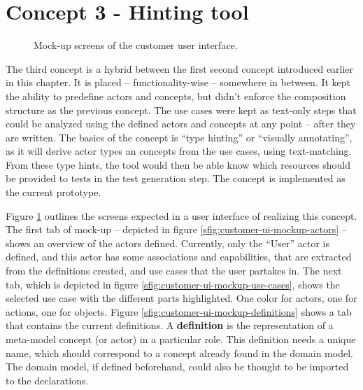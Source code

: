 \section{Concept 3 - Hinting tool}
\label{sec:3rd-iteration}
\begin{figure}[!htbp]
  \centering
    
  \caption{Mock-up screens of the customer user interface.}
  \label{fig:concept3-mockup-screens}
\end{figure}
\noindent The third concept is a hybrid between the first second concept introduced earlier in this chapter. It is placed -- functionality-wise -- somewhere in between. It kept the ability to predefine actors and concepts, but didn't enforce the composition structure as the previous concept. The use cases were kept as text-only steps that could be analyzed using the defined actors and concepts at any point -- after they are written. The basics of the concept is ``type hinting'' or ``visually annotating'', as it will derive actor types an concepts from the use cases, using text-matching. From these type hints, the tool would then be able know which resources should be provided to tests in the test generation step. The concept is implemented as the current prototype.\medskip

\noindent Figure \ref{fig:concept3-mockup-screens} outlines the screens expected in a user interface of realizing this concept. The first tab of mock-up -- depicted in figure \ref{sfig:customer-ui-mockup-actors} -- shows an overview of the actors defined. Currently, only the ``User'' actor is defined, and this actor has some associations and capabilities, that are extracted from the definitions created, and use cases that the user partakes in. The next tab, which is depicted in figure \ref{sfig:customer-ui-mockup-use-cases}, shows the selected use case with the different parts highlighted. One color for actors, one for actions, one for objects. Figure \ref{sfig:customer-ui-mockup-definitions} shows a tab that contains the current definitions. A \textbf{definition} is the representation of a meta-model concept (or actor) in a particular role. This definition needs a unique name, which should correspond to a concept already found in the domain model. The domain model, if defined beforehand, could also be thought to be imported to the declarations.

